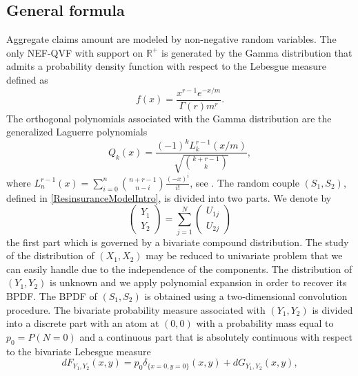 \subsection{General formula}
Aggregate claims amount are modeled by non-negative random variables. The only NEF-QVF with support on $\mathbb{R}^{+}$ is generated by the Gamma distribution that admits a probability density function with respect to the Lebesgue measure defined as 
\begin{equation}\label{GammaPDF}
f(x)=\frac{x^{r-1}e^{-x/m}}{\Gamma(r)m^{r}}.
\end{equation}
The orthogonal polynomials associated with the Gamma distribution are the generalized Laguerre polynomials
\begin{equation}\label{LaguerrePolynomials}
Q_{k}(x)=\frac{(-1)^{k}L_{k}^{r-1}(x/m)}{\sqrt{\binom{k+r-1}{k}}},
\end{equation}
where $L_{n}^{r-1}(x)=\sum^{n}_{i=0}\binom{n+r-1}{n-i}\frac{(-x)^{i}}{i!}$, see \citet{Sz39}. The random couple $(S_{1},S_{2})$, defined in \eqref{ResinsuranceModelIntro}, is divided into two parts. We denote by 
 \begin{equation}\label{BivariateCompoundDistributionRV}
\left( \begin{array}{l}
Y_1 \\
Y_2 \end{array}
\right)  =
 \displaystyle\sum_{j=1}^{N}
\left( \begin{array}{l}
U_{1j} \\
U_{2j} \end{array}
\right)
\end{equation}
the first part which is governed by a bivariate compound distribution. The study of the distribution of $(X_{1},X_{2})$ may be reduced to univariate problem that we can easily handle due to the independence of the components. The distribution of $(Y_{1},Y_{2})$ is unknown and we apply polynomial expansion in order to recover its BPDF. The BPDF of $(S_{1},S_{2})$ is obtained using a two-dimensional convolution procedure. The bivariate probability measure associated with $(Y_{1},Y_{2})$ is divided into a discrete part with an atom at $(0,0)$ with a probability mass equal to $p_{0}=P(N=0)$ and a continuous part that is absolutely continuous with respect to the bivariate Lebesgue measure
\begin{equation}\label{BivariateAgregateClaimProbabilityMeasure}
dF_{Y_{1},Y_{2}}(x,y)=p_{0}\delta_{\{x=0,y=0\}}(x,y)+dG_{Y_{1},Y_{2}}(x,y),
\end{equation}
